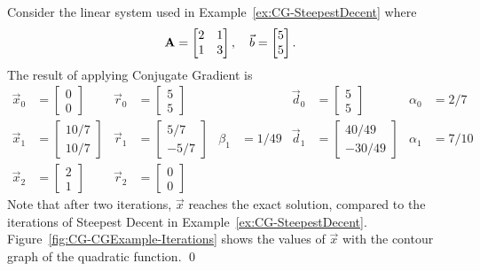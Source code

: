 \begin{example}
\label{ex:CG-CG}
Consider the linear system used in Example~\ref{ex:CG-SteepestDecent} where
\[
	\mathbf{A} = \begin{bmatrix} 2 & 1 \\ 1 & 3 \end{bmatrix},
	\quad
	\vec{b} = \begin{bmatrix} 5 \\ 5 \end{bmatrix}.
\]
The result of applying Conjugate Gradient is
\begin{align*}
	 \vec{x}_0 &= \begin{bmatrix}0\\0\end{bmatrix}
	&\vec{r}_0 &= \begin{bmatrix}5\\5\end{bmatrix}
	& &
	&\vec{d}_0 &= \begin{bmatrix}5\\5\end{bmatrix}
	&\alpha_0  &= 2/7 \\
	 \vec{x}_1 &= \begin{bmatrix}10/7\\10/7\end{bmatrix}
	&\vec{r}_1 &= \begin{bmatrix}5/7\\-5/7\end{bmatrix}
	&\beta_1   &= 1/49
	&\vec{d}_1 &= \begin{bmatrix}40/49\\-30/49\end{bmatrix}
	&\alpha_1  &= 7/10 \\
	 \vec{x}_2 &= \begin{bmatrix}2\\1\end{bmatrix}
	&\vec{r}_2 &= \begin{bmatrix}0\\0\end{bmatrix}
\end{align*}
Note that after two iterations, \(\vec{x}\) reaches the exact solution, compared to the iterations of Steepest Decent in Example~\ref{ex:CG-SteepestDecent}.
Figure~\ref{fig:CG-CGExample-Iterations} shows the values of \(\vec{x}\) with the contour graph of the quadratic function. \qed

\end{example}

